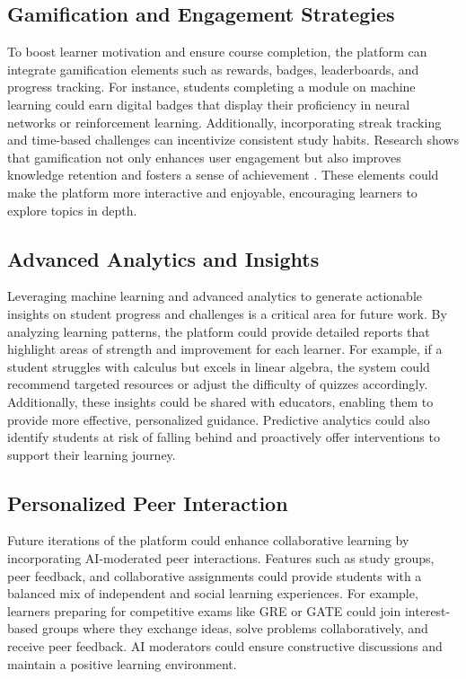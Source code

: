 \subsection{Gamification and Engagement Strategies}
To boost learner motivation and ensure course completion, the platform can integrate gamification elements such as rewards, badges, leaderboards, and progress tracking. For instance, students completing a module on machine learning could earn digital badges that display their proficiency in neural networks or reinforcement learning. Additionally, incorporating streak tracking and time-based challenges can incentivize consistent study habits. Research shows that gamification not only enhances user engagement but also improves knowledge retention and fosters a sense of achievement \cite{gamification2021}. These elements could make the platform more interactive and enjoyable, encouraging learners to explore topics in depth.

\subsection{Advanced Analytics and Insights}
Leveraging machine learning and advanced analytics to generate actionable insights on student progress and challenges is a critical area for future work. By analyzing learning patterns, the platform could provide detailed reports that highlight areas of strength and improvement for each learner. For example, if a student struggles with calculus but excels in linear algebra, the system could recommend targeted resources or adjust the difficulty of quizzes accordingly. Additionally, these insights could be shared with educators, enabling them to provide more effective, personalized guidance. Predictive analytics could also identify students at risk of falling behind and proactively offer interventions to support their learning journey.

\subsection{Personalized Peer Interaction}
Future iterations of the platform could enhance collaborative learning by incorporating AI-moderated peer interactions. Features such as study groups, peer feedback, and collaborative assignments could provide students with a balanced mix of independent and social learning experiences. For example, learners preparing for competitive exams like GRE or GATE could join interest-based groups where they exchange ideas, solve problems collaboratively, and receive peer feedback. AI moderators could ensure constructive discussions and maintain a positive learning environment.

